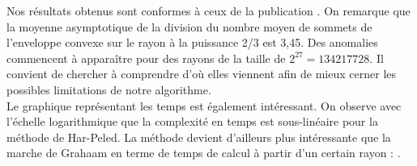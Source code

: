 Nos résultats obtenus sont conformes à ceux de la publication \cite{HarPeled98}. On remarque que la moyenne asymptotique de la division du nombre moyen de sommets de l'enveloppe convexe sur le rayon à la puissance 2/3 est 3,45. Des anomalies commencent à apparaître pour des rayons de la taille de $2^{27} = 134217728$. Il convient de chercher à comprendre d'où elles viennent afin de mieux cerner les possibles limitations de notre algorithme.\\

Le graphique représentant les temps est également intéressant. On observe avec l'échelle logarithmique que la complexité en temps est sous-linéaire pour la méthode de Har-Peled. La méthode devient d'ailleurs plus intéressante que la marche de Grahaam en terme de temps de calcul à partir d'un certain rayon : .




